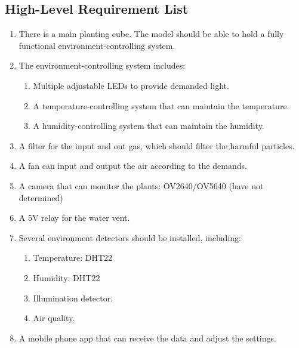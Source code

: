 \clearpage


\subsection{High-Level Requirement List}
\begin{enumerate}
    \item There is a main planting cube. The model should be able to hold a fully functional environment-controlling system.
    \item The environment-controlling system includes:
        \begin{enumerate}
        \item Multiple adjustable LEDs to provide demanded light.
        \item A temperature-controlling system that can maintain the temperature.
        \item A humidity-controlling system that can maintain the humidity.
        \end{enumerate}
    \item A filter for the input and out gas, which should filter the harmful particles.
    \item A fan can input and output the air according to the demands.
    \item A camera that can monitor the plants: OV2640/OV5640 (have not determined)
    \item A 5V relay for the water vent.
    \item Several environment detectors should be installed, including:
        \begin{enumerate}
            \item Temperature: DHT22\cite{dht22}
            \item Humidity: DHT22\cite{dht22}
            \item Illumination detector.
            \item Air quality.
        \end{enumerate}
    \item A mobile phone app that can receive the data and adjust the settings.
\end{enumerate}
